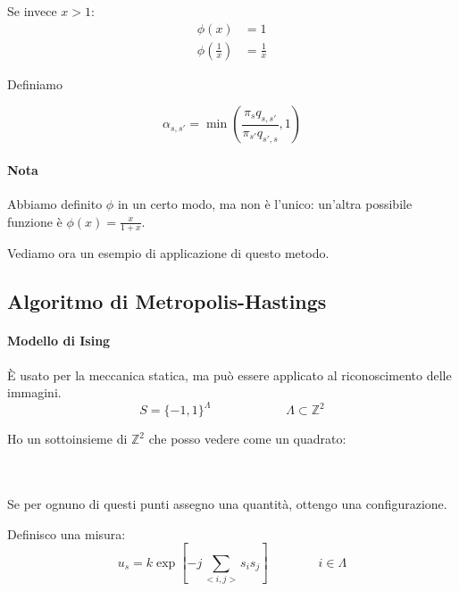 \documentclass[a4paper,12pt]{book}
\newcommand\ddfrac[2]{\frac{\displaystyle #1}{\displaystyle #2}}
\begin{document}
Se invece $ x > 1 $: 
\begin{align*}
	\phi(x) & = 1 \\
	\phi(\frac{1}{x}) & = \frac{1}{x} %
\end{align*}

Definiamo

$$ \alpha_{s,s'} = \min\left(\ddfrac{\pi_s q_{s,s'}}{\pi_{s'}q_{s',s}}, 1\right)$$

\paragraph{Nota} Abbiamo definito $\phi$ in un certo modo, ma non è l'unico: un'altra possibile funzione è $ \phi(x) = \ddfrac{x}{1+x} $.

Vediamo ora un esempio di applicazione di questo metodo. 

\subsection{Algoritmo di Metropolis-Hastings}
\paragraph{Modello di Ising}
È usato per la meccanica statica, ma può essere applicato al riconoscimento delle immagini. 
$$ S = \{-1, 1\}^\Lambda \qquad \qquad \qquad \Lambda \subset \mathbb{Z}^2 $$

Ho un sottoinsieme di $ \mathbb{Z}^2 $ che posso vedere come un quadrato:

\begin{multicols}{2}
	\\
	\\
	Se per ognuno di questi punti assegno una quantità, ottengo una configurazione. 
	
	Definisco una misura:
	$$ u_s = k \exp \left[-j \sum_{<i,j>}s_i s_j\right] \qquad \qquad i \in \Lambda $$
\end{multicols}
\end{document}
